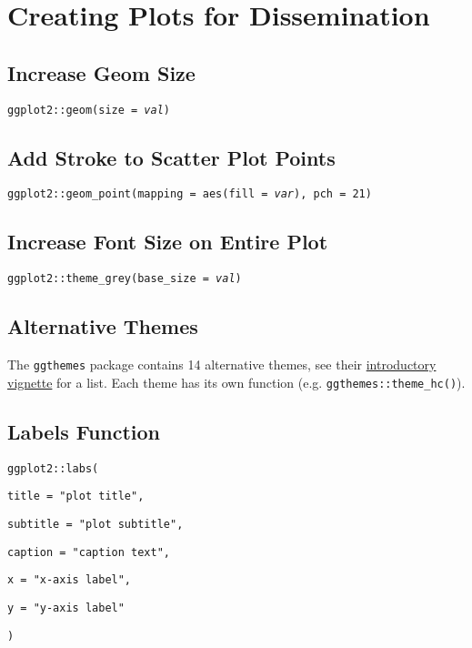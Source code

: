 \documentclass{tufte-handout}
\newenvironment{subs}
  {\adjustwidth{3em}{0pt}}
  {\endadjustwidth}
\begin{document}
\section{Creating Plots for Dissemination}
\begin{subs}
\subsection{Increase Geom Size}
\noindent \texttt{ggplot2::}\texttt{geom(size = \textit{val})}

\vspace{3mm}
\subsection{Add Stroke to Scatter Plot Points}
\begin{fullwidth}
\noindent \texttt{ggplot2::}{\color{red}\texttt{geom\_point}}\texttt{(mapping = aes(fill = \textit{var}), pch = 21)}
\end{fullwidth}

\vspace{3mm}
\subsection{Increase Font Size on Entire Plot}
\noindent \texttt{ggplot2::}{\color{red}\texttt{theme\_grey}}\texttt{(base\_size = \textit{val})}

\vspace{3mm}
\subsection{Alternative Themes}
\noindent The \texttt{ggthemes} package contains 14 alternative themes, see their \href{https://cran.r-project.org/web/packages/ggthemes/vignettes/ggthemes.html}{introductory vignette} for a list. Each theme has its own function (e.g. \texttt{ggthemes::}{\color{red}\texttt{theme\_hc}}\texttt{()}).

\newpage
\subsection{Labels Function}
\noindent \texttt{ggplot2::}{\color{red}\texttt{labs}}\texttt{(}
\par \texttt{title = "plot title",}
\par \texttt{subtitle = "plot subtitle",}
\par \texttt{caption = "caption text",}
\par \texttt{x = "x-axis label",}
\par \texttt{y = "y-axis label"}
\par \noindent \texttt{)}


\end{subs}
\end{document}
